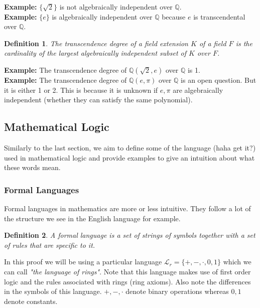 \documentclass{article}
\newtheorem{defn}{Definition}
\begin{document}
\noindent \textbf{Example:} $\{\sqrt{2}\}$ is not algebraically independent over $\mathbb{Q}$. \\[.07in]

\noindent \textbf{Example:} $\{e\}$ is algebraically independent over $\mathbb{Q}$ because $e$ is transcendental over $\mathbb{Q}$.

\begin{defn}
    The transcendence degree of a field extension $K$ of a field $F$ is the cardinality of the largest algebraically independent subset of $K$ over $F$.
\end{defn}

\noindent \textbf{Example:} The transcendence degree of $\mathbb{Q}(\sqrt{2},e)$ over $\mathbb{Q}$ is 1.\\[.07in]

\noindent\textbf{Example:} The transcendence degree of $\mathbb{Q}(e,\pi)$ over $\mathbb{Q}$ is an open question. But it is either 1 or 2. This is because it is unknown if $e,\pi$ are algebraically independent (whether they can satisfy the same polynomial).

\subsection{Mathematical Logic}
Similarly to the last section, we aim to define some of the language (haha get it?) used in mathematical logic and provide examples to give an intuition about what these words mean.

\subsubsection{Formal Languages}
Formal languages in mathematics are more or less intuitive. They follow a lot of the structure we see in the English language for example. 

\begin{defn}
    A formal language is a set of strings of symbols together with a set of rules that are specific to it.
\end{defn}

In this proof we will be using a particular language $\mathcal{L}_{r} = \{+,
-,\cdot,0,1\}$ which we can call \textit{"the language of rings"}. Note that
this language makes use of first order logic and the rules associated with rings
(ring axioms). Also note the differences in the symbols of this language.
$+,-,\cdot$ denote binary operations whereas $0,1$ denote constants.\\[.07in]
\end{document}

